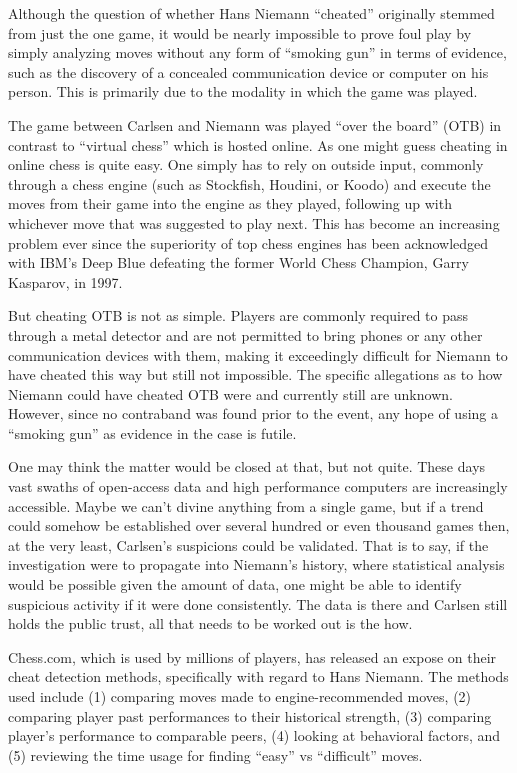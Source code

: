\documentclass[12pt, letterpaper, titlepage]{article}
\begin{document}
Although the question of whether Hans Niemann “cheated” originally stemmed from just the one game, it would be nearly impossible to prove foul play by simply analyzing moves without any form of “smoking gun” in terms of evidence, such as the discovery of a concealed communication device or computer on his person. This is primarily due to the modality in which the game was played.

The game between Carlsen and Niemann was played “over the board” (OTB) in contrast to “virtual chess” which is hosted online. As one might guess cheating in online chess is quite easy. One simply has to rely on outside input, commonly through a chess engine (such as Stockfish, Houdini, or Koodo) and execute the moves from their game into the engine as they played, following up with whichever move that was suggested to play next. This has become an increasing problem ever since the superiority of top chess engines has been acknowledged with IBM's Deep Blue defeating the former World Chess Champion, Garry Kasparov, in 1997.

But cheating OTB is not as simple. Players are commonly required to pass through a metal detector and are not permitted to bring phones or any other communication devices with them, making it exceedingly difficult for Niemann to have cheated this way but still not impossible. The specific allegations as to how Niemann could have cheated OTB were and currently still are unknown. However, since no contraband was found prior to the event, any hope of using a “smoking gun” as evidence in the case is futile.

One may think the matter would be closed at that, but not quite. These days vast swaths of open-access data and high performance computers are increasingly accessible. Maybe we can't divine anything from a single game, but if a trend could somehow be established over several hundred or even thousand games then, at the very least, Carlsen's suspicions could be validated. That is to say, if the investigation were to propagate into Niemann's history, where statistical analysis would be possible given the amount of data, one might be able to identify suspicious activity if it were done consistently. The data is there and Carlsen still holds the public trust, all that needs to be worked out is the how.

Chess.com\citet{chess2022cheating}, which is used by millions of players, has released an expose on their cheat detection methods, specifically with regard to Hans Niemann. The methods used include (1) comparing moves made to engine-recommended moves, (2) comparing player past performances to their historical strength, (3) comparing player's performance to comparable peers, (4) looking at behavioral factors, and (5) reviewing the time usage for finding “easy” vs “difficult” moves.
\end{document}
